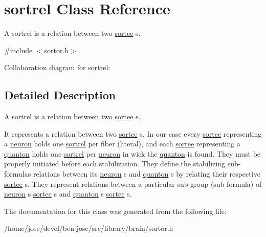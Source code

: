 \hypertarget{classsortrel}{}\section{sortrel Class Reference}
\label{classsortrel}


A sortrel is a relation between two \hyperlink{classsortee}{sortee} s.  




{\ttfamily \#include $<$sortor.\+h$>$}



Collaboration diagram for sortrel\+:


\subsection{Detailed Description}
A sortrel is a relation between two \hyperlink{classsortee}{sortee} s. 

It represents a relation between two \hyperlink{classsortee}{sortee} s. In our case every \hyperlink{classsortee}{sortee} representing a \hyperlink{classneuron}{neuron} holds one \hyperlink{classsortrel}{sortrel} per fiber (literal), and each \hyperlink{classsortee}{sortee} representing a \hyperlink{classquanton}{quanton} holds one \hyperlink{classsortrel}{sortrel} per \hyperlink{classneuron}{neuron} in wick the \hyperlink{classquanton}{quanton} is found. They must be properly initiated before each stabilization. They define the stabilizing sub-\/formula\textquotesingle{}s relations between it\textquotesingle{}s \hyperlink{classneuron}{neuron} s and \hyperlink{classquanton}{quanton} s by relating their respective \hyperlink{classsortee}{sortee} s. They represent relations between a particular sub group (sub-\/formula) of \hyperlink{classneuron}{neuron} \textquotesingle{}s \hyperlink{classsortee}{sortee} s and \hyperlink{classquanton}{quanton} \textquotesingle{}s \hyperlink{classsortee}{sortee} s. 

The documentation for this class was generated from the following file\+:\begin{DoxyCompactItemize}
\item 
/home/jose/devel/ben-\/jose/src/library/brain/sortor.\+h\end{DoxyCompactItemize}
